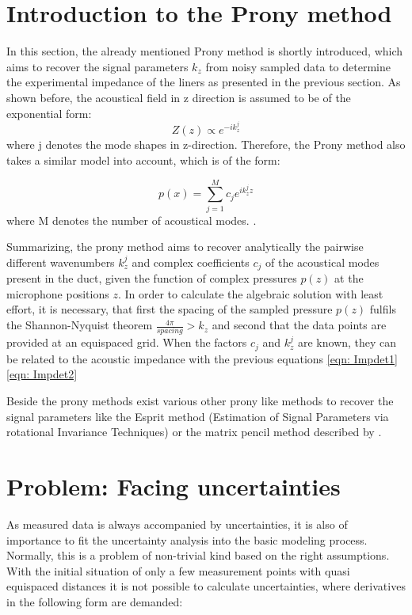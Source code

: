 \documentclass[11pt]{report} %
\begin{document}
\section{Introduction to the Prony method}
In this section, the already mentioned Prony method is shortly introduced, which aims to recover the signal parameters $k_z$ from noisy sampled data to determine the experimental impedance of the liners as presented in the previous section.
As shown before, the acoustical field in z direction is assumed to be of the exponential form:
\begin{equation}
Z(z)\propto e^{-ik_z^j}
\end{equation}
where j denotes the mode shapes in z-direction. 
Therefore, the Prony method also takes a similar model into account, which is of the form: 

\begin{equation}\label{eqn: expsum}
 p(x)=\sum\limits_{j=1}^M c_{j}e^{ik_z^jz} 
\end{equation}
where M denotes the number of acoustical modes. . 

Summarizing, the prony method aims to recover analytically the pairwise different wavenumbers $k_z^{j}$ and complex coefficients $c_{j}$ of the acoustical modes present in the duct, given the function of complex pressures $p(z)$ at the microphone positions $z$. 
In order to calculate the algebraic solution with least effort, it is necessary, that first the spacing of the sampled pressure $p(z)$ fulfils the Shannon-Nyquist theorem $\frac{4\pi}{spacing}>k_z$ and second that the data points are provided at an equispaced grid.
When the factors $c_j$ and $k_z^j$ are known, they can be related to the acoustic impedance with the previous equations \eqref{eqn: Impdet1}\eqref{eqn: Impdet2}
 
Beside the prony methods exist various other prony like methods to recover the signal parameters like the Esprit method (Estimation of Signal Parameters via rotational Invariance Techniques) or the matrix pencil method described by \cite{Peter2011}.

\section{Problem: Facing uncertainties}
As measured data is always accompanied by uncertainties, it is also of importance to fit the uncertainty analysis into the basic modeling process.
Normally, this is a problem of non-trivial kind based on the right assumptions.
With the initial situation of only a few measurement points with quasi equispaced distances it is not possible to calculate uncertainties, where derivatives in the following form are demanded:
\end{document}
